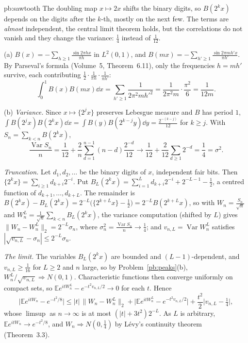 \begin{solution}{pb:sawtooth}
\idea The doubling map $x\mapsto2x$ shifts the binary digits, so $B(2^kx)$ depends on the digits after the $k$-th, mostly on the next few. The terms are
\emph{almost} independent, the central limit theorem holds, but the correlations do not vanish and they change the variance: $\frac14$ instead of $\frac1{12}$.

\writeup (a) $B(x)=-\sum_{h\ge1}\frac{\sin2\pi hx}{\pi h}$ in $L^2(0,1)$, and $B(mx)=-\sum_{h'\ge1}\frac{\sin2\pi mh'x}{\pi h'}$. By Parseval's formula (Volume~5, Theorem~6.11), only the
frequencies $h=mh'$ survive, each contributing $\frac12\cdot\frac1{\pi h}\cdot\frac1{\pi h'}$:
\[
\int_0^1B(x)B(mx)\dd x=\sum_{h'\ge1}\frac1{2\pi^2mh'^2}=\frac1{2\pi^2m}\cdot\frac{\pi^2}6=\frac1{12m}.
\]

(b) \emph{Variance.} Since $x\mapsto\{2^jx\}$ preserves Lebesgue measure and $B$ has period $1$, $\int B(2^jx)B(2^kx)\dd x=\int B(y)B(2^{k-j}y)\dd y=\frac{2^{-(k-j)}}{12}$ for
$k\ge j$. With $S_n=\sum_{k<n}B(2^kx)$,
\[
\frac{\operatorname{Var}S_n}n=\frac1{12}+\frac2n\sum_{d=1}^{n-1}(n-d)\frac{2^{-d}}{12}\longrightarrow\frac1{12}+\frac2{12}\sum_{d\ge1}2^{-d}=\frac14=\sigma^2.
\]

\emph{Truncation.} Let $d_1,d_2,\dots$ be the binary digits of $x$, independent fair bits. Then $\{2^kx\}=\sum_{i\ge1}d_{k+i}2^{-i}$. Put
$B_L(2^kx)=\sum_{i=1}^Ld_{k+i}2^{-i}+2^{-L-1}-\frac12$, a centred function of $d_{k+1},\dots,d_{k+L}$. The remainder is
$B(2^kx)-B_L(2^kx)=2^{-L}\bigl(\{2^{k+L}x\}-\frac12\bigr)=2^{-L}B(2^{k+L}x)$, so with $W_n=\frac{S_n}{\sqrt n}$ and $W_n^L=\frac1{\sqrt n}\sum_{k<n}B_L(2^kx)$, the variance
computation (shifted by $L$) gives $\|W_n-W_n^L\|_2=2^{-L}\sigma_n$, where $\sigma_n^2=\frac{\operatorname{Var}S_n}n\to\frac14$; and $v_{n,L}=\operatorname{Var}W_n^L$ satisfies
$|\sqrt{v_{n,L}}-\sigma_n|\le2^{-L}\sigma_n$.

\emph{The limit.} The variables $B_L(2^kx)$ are bounded and $(L-1)$-dependent, and $v_{n,L}\ge\frac1{16}$ for $L\ge2$ and $n$ large, so by Problem~\ref{pb:peaks}(b),
$W_n^L/\sqrt{v_{n,L}}\Rightarrow N(0,1)$. Characteristic functions then converge uniformly on compact sets, so $\mathbb Ee^{itW_n^L}-e^{-t^2v_{n,L}/2}\to0$ for each $t$. Hence
\[
\bigl|\mathbb Ee^{itW_n}-e^{-t^2/8}\bigr|\le|t|\,\|W_n-W_n^L\|_2+\bigl|\mathbb Ee^{itW_n^L}-e^{-t^2v_{n,L}/2}\bigr|+\frac{t^2}2\bigl|v_{n,L}-\tfrac14\bigr|,
\]
whose $\limsup$ as $n\to\infty$ is at most $(|t|+3t^2)2^{-L}$. As $L$ is arbitrary, $\mathbb Ee^{itW_n}\to e^{-t^2/8}$, and $W_n\Rightarrow N(0,\frac14)$ by Lévy's continuity
theorem (Theorem~3.3).


\end{solution}
